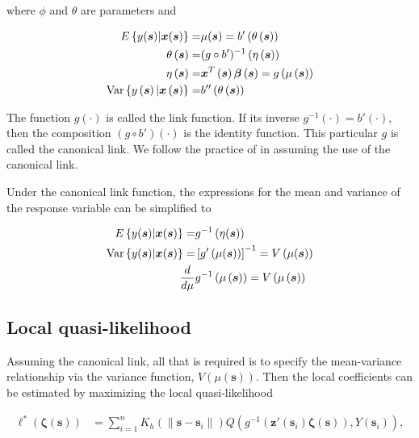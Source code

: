 \documentclass[authoryear,review, 12pt]{elsarticle}
\begin{document}
where $\phi$ and $\theta$ are parameters and

\begin{align*}
E\left\{ y(\bm{s})|\bm{x}(\bm{s})\right\} = & \mu(\bm{s})=b'\left(\theta\left(\bm{s}\right)\right)\\
\theta\left(\bm{s}\right)= & (g\circ b')^{-1}\left(\eta\left(\bm{s}\right)\right)\\
\eta\left(\bm{s}\right)= & \bm{x}^{T}\left(\bm{s}\right)\bm{\beta}\left(\bm{s}\right)=g\left(\mu\left(\bm{s}\right)\right)\\
\text{\text{Var}}\left\{ y\left(\bm{s}\right)|\bm{x}\left(\bm{s}\right)\right\} = & b''\left(\theta\left(\bm{s}\right)\right)
\end{align*}


The function $g(\cdot)$ is called the link function. If its inverse
$g^{-1}(\cdot)=b'(\cdot)$, then the composition $\left(g\circ b'\right)\left(\cdot\right)$
is the identity function. This particular $g$ is called the canonical
link. We follow the practice of \citet{Fan-Heckman-Wand-1995} in
assuming the use of the canonical link.

Under the canonical link function, the expressions for the mean and
variance of the response variable can be simplified to

\begin{align*}
E\left\{ y(\bm{s})|\bm{x}(\bm{s})\right\} = & g^{-1}\left(\eta(\bm{s})\right)\\
\text{\text{Var}}\left\{ y(\bm{s})|\bm{x}(\bm{s})\right\} = & \left[g'\left(\mu(\bm{s})\right)\right]^{-1}=V\left(\mu(\bm{s})\right)\\
\frac{d}{d\mu} & g^{-1}\left(\mu\left(\bm{s}\right)\right)=V\left(\mu\left(\bm{s}\right)\right)
\end{align*}
 


\subsection{Local quasi-likelihood}

Assuming the canonical link, all that is required is to specify the
mean-variance relationship via the variance function, $V\left(\mu\left(\bm{s}\right)\right)$.
Then the local coefficients can be estimated by maximizing the local
quasi-likelihood 

\begin{align}
\mathcal{\ell}^{*}\left(\bm{\zeta}(\bm{s})\right) & =\sum_{i=1}^{n}K_{h}\left(\|\bm{s}-\bm{s}_{i}\|\right)Q\left(g^{-1}\left(\bm{z}'(\bm{s}_{i})\bm{\zeta}(\bm{s})\right),Y(\bm{s}_{i})\right),
\end{align}
\end{document}

